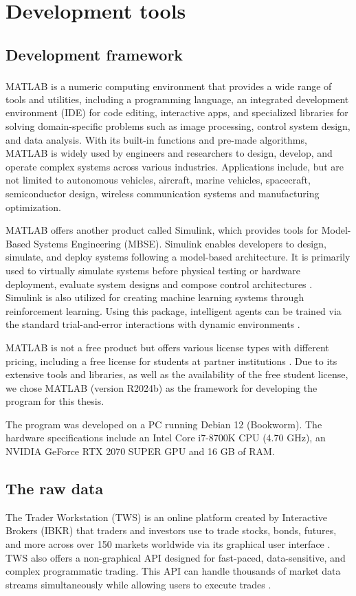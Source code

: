 \documentclass[a4paper,oneside,onecolumn,12pt]{book}
\begin{document}
\section{Development tools}
	\subsection{Development framework}
	MATLAB\textsuperscript{\textcopyright} is a numeric computing environment that provides a wide range of tools and utilities, including a programming language, an integrated development environment (IDE) for code editing, interactive apps, and specialized libraries for solving domain-specific problems such as image processing, control system design, and data analysis. With its built-in functions and pre-made algorithms, MATLAB is widely used by engineers and researchers to design, develop, and operate complex systems across various industries. Applications include, but are not limited to autonomous vehicles, aircraft, marine vehicles, spacecraft, semiconductor design, wireless communication systems and manufacturing optimization. \cite{WhatIsMATLAB}

	MATLAB offers another product called Simulink, which provides tools for Model-Based Systems Engineering (MBSE). Simulink enables developers to design, simulate, and deploy systems following a model-based architecture. It is primarily used to virtually simulate systems before physical testing or hardware deployment, evaluate system designs and compose control architectures \cite{WhatIsSimulink}. Simulink is also utilized for creating machine learning systems through reinforcement learning. Using this package, intelligent agents can be trained via the standard trial-and-error interactions with dynamic environments \cite{SimulinkAI}. 

	MATLAB is not a free product but offers various license types with different pricing, including a free license for students at partner institutions \cite{MATLABPricing}. Due to its extensive tools and libraries, as well as the availability of the free student license, we chose MATLAB (version R2024b) as the framework for developing the program for this thesis.

	The program was developed on a PC running Debian 12 (Bookworm). The hardware specifications include an Intel Core i7-8700K CPU (4.70 GHz), an NVIDIA GeForce RTX 2070 SUPER GPU and 16 GB of RAM.

	\subsection{The raw data}
	The Trader Workstation (TWS) is an online platform created by Interactive Brokers (IBKR) that traders and investors use to trade stocks, bonds, futures, and more across over 150 markets worldwide via its graphical user interface \cite{TW}. TWS also offers a non-graphical API designed for fast-paced, data-sensitive, and complex programmatic trading. This API can handle thousands of market data streams simultaneously while allowing users to execute trades \cite{IBKRAPI}.
\end{document}
